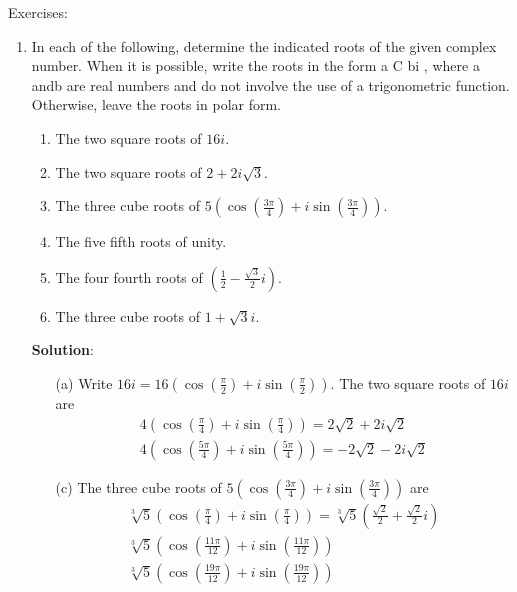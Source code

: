 \documentclass{article}
\begin{document}
Exercises:
\begin{enumerate}
\item In each of the following, determine the indicated roots of the given complex number. When it is possible, write the roots in the form a $\mathrm{C}$ bi , where a andb are real numbers and do not involve the use of a trigonometric function. Otherwise, leave the roots in polar form.

\begin{enumerate}
\item The two square roots of $16 i$.
\item The two square roots of $2+2 i \sqrt{3}$.
\item The three cube roots of $5\left(\cos \left(\frac{3 \pi}{4}\right)+i \sin \left(\frac{3 \pi}{4}\right)\right)$.
\item The five fifth roots of unity.
\item The four fourth roots of $\left(\frac{1}{2}-\frac{\sqrt{3}}{2} i\right)$.
\item The three cube roots of $1+\sqrt{3} i$.
\end{enumerate}
\textbf{Solution}:
\begin{enumerate}
  \item[(a)] Write $16 i=16\left(\cos \left(\frac{\pi}{2}\right)+i \sin \left(\frac{\pi}{2}\right)\right)$. The two square roots of $16 i$ are
$$
\begin{gathered}
4\left(\cos \left(\frac{\pi}{4}\right)+i \sin \left(\frac{\pi}{4}\right)\right)=2 \sqrt{2}+2 i \sqrt{2} \\
4\left(\cos \left(\frac{5 \pi}{4}\right)+i \sin \left(\frac{5 \pi}{4}\right)\right)=-2 \sqrt{2}-2 i \sqrt{2}
\end{gathered}
$$

  \item[(c)] The three cube roots of $5\left(\cos \left(\frac{3 \pi}{4}\right)+i \sin \left(\frac{3 \pi}{4}\right)\right)$ are
$$
\begin{gathered}
\sqrt[3]{5}\left(\cos \left(\frac{\pi}{4}\right)+i \sin \left(\frac{\pi}{4}\right)\right)=\sqrt[3]{5}\left(\frac{\sqrt{2}}{2}+\frac{\sqrt{2}}{2} i\right) \\
\sqrt[3]{5}\left(\cos \left(\frac{11 \pi}{12}\right)+i \sin \left(\frac{11 \pi}{12}\right)\right) \\
\sqrt[3]{5}\left(\cos \left(\frac{19 \pi}{12}\right)+i \sin \left(\frac{19 \pi}{12}\right)\right)
\end{gathered}
$$
\end{enumerate}





\end{enumerate}
\end{document}
